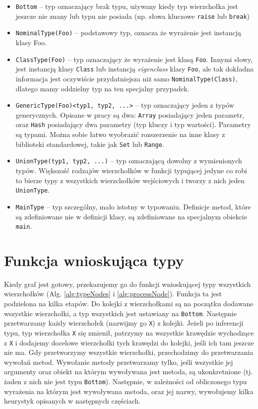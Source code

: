 \documentclass[shortabstract,mgr]{iithesis}
\begin{document}
\begin{itemize}
 \item \texttt{Bottom} -- typ oznaczający brak typu, używany kiedy typ wierzchołka jest jeszcze nie znany lub typu nie posiada (np. słowa kluczowe \texttt{raise} lub \texttt{break})
 \item \texttt{NominalType(Foo)} -- podstawowy typ, oznacza że wyrażenie jest instancją klasy Foo.
 \item \texttt{ClassType(Foo)} -- typ oznaczający że wyrażenie jest klasą \texttt{Foo}. Innymi słowy, jest instancją klasy \texttt{Class} lub instancją \textit{eigenclass} klasy \texttt{Foo}, ale tak dokładna informacja jest oczywiście przydatniejsza niż samo \texttt{NominalType(Class)}, dlatego mamy oddzielny typ na ten specjalny przypadek.
 \item \texttt{GenericType(Foo)<typ1, typ2, ...>} -- typ oznaczający jeden z typów generycznych. Opisane w pracy są dwa: \texttt{Array} posiadający jeden parametr, oraz \texttt{Hash} posiadający dwa parametry (typ kluczy i typ wartości). Parametry są typami. Można sobie łatwo wyobrazić rozszerzenie na inne klasy z biblioteki standardowej, takie jak \texttt{Set} lub \texttt{Range}.
 \item \texttt{UnionType(typ1, typ2, ...)} -- typ oznaczającą dowolny z wymienionych typów. Większość rodzajów wierzchołków w funkcji typującej jedyne co robi to bierze typy z wszystkich wierzchołków wejściowych i tworzy z nich jeden \texttt{UnionType}.
 \item \texttt{MainType} -- typ szczególny, mało istotny w typowaniu. Definicje metod, które są zdefiniowane nie w definicji klasy, są zdefiniowane na specjalnym obiekcie \texttt{main}.
\end{itemize}



\section{Funkcja wnioskująca typy}

Kiedy graf jest gotowy, przekazujemy go do funkcji wnioskującej typy wszystkich wierzchołków (Alg. \ref{alg:typeNodes} i \ref{alg:processNode}). Funkcja ta jest podzielona na kilka etapów.
Do kolejki z wierzchołkami są na początku dodawane wszystkie wierzchołki, a typ wszystkich jest ustawiany na \texttt{Bottom}.
Następnie przetwarzamy każdy wierzchołek (nazwijmy go \texttt{X}) z kolejki.
Jeżeli po inferencji typu, typ wierzchołka \texttt{X} się zmienił, patrzymy na wszystkie krawędzie wychodzące z \texttt{X} i dodajemy docelowe wierzchołki tych krawędzi do kolejki, jeśli ich tam jeszcze nie ma.
Gdy przetworzymy wszystkie wierzchołki, przechodzimy do przetwarzania wywołań metod.
Wywołanie metody przetwarzamy tylko, jeśli wszystkie jej argumenty oraz obiekt na którym wywoływana jest metoda, są ukonkretnione (tj. żaden z nich nie jest typu \texttt{Bottom}).
Następnie, w zależności od obliczonego typu wyrażenia na którym jest wywoływana metoda, oraz jej nazwy, wywołujemy kilka heurystyk opisanych w następnych częściach.
\end{document}
